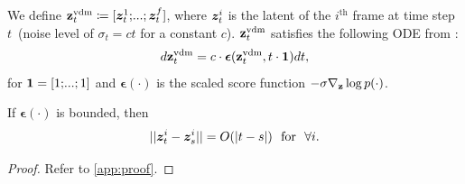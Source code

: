 \begin{definition} \label{def0}
    We define $\z^{\text{vdm}}_{t}\coloneqq[\gz_{t}^1;\text{\myldots};\gz_{t}^f]$,
    where $\bm{z}_{t}^i$ is the latent of the $i^\text{th}$ frame at time step $t$~(noise level of $\sigma_t = ct$ for a constant $c$).
    $\mathbf{z}^{\text{vdm}}_{t}$ satisfies the following ODE from \citep{karras2022elucidating}:
    \begin{align}
    	d\mathbf{z}_{t}^\text{vdm} = c\cdot\bm{\epsilon}(\mathbf{z}^{\text{vdm}}_{t}, t\cdot\bm{1})dt \label{thm1:ode},
    \end{align}
    for $\bm{1}=[1;\text{\myldots};1]$ and $\bm{\epsilon}(\cdot)$ is the scaled score function $-\sigma\nabla_{\mathbf{z}} \log p(\cdot)$.
\end{definition}


\begin{lemma} \label{lemma1}
    If $\bm{\epsilon}(\cdot)$ is bounded, then
    \begin{align*}
        ||\bm{z}_{t}^i - \bm{z}_{s}^i|| = O(|t - s|) ~~\text{for} ~~\forall i.
    \end{align*}
\end{lemma}

\begin{proof}
    Refer to \cref{app:proof}.
\end{proof}


